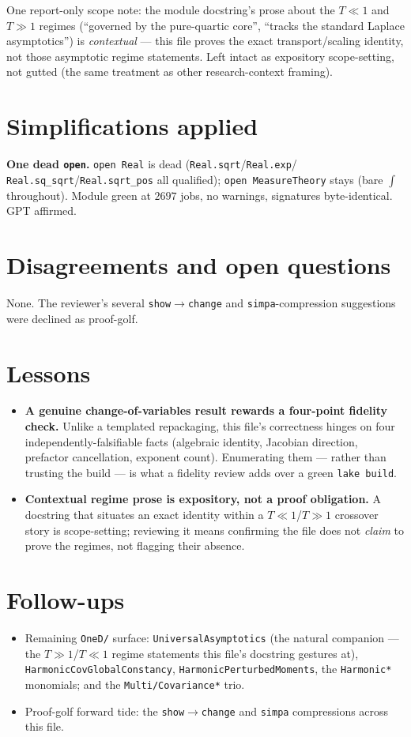\documentclass[11pt]{article}
\begin{document}
One report-only scope note: the module docstring's prose about the $T\ll1$ and $T\gg1$ regimes
(``governed by the pure-quartic core'', ``tracks the standard Laplace asymptotics'') is
\emph{contextual} --- this file proves the exact transport/scaling identity, not those asymptotic
regime statements. Left intact as expository scope-setting, not gutted (the same treatment as other
research-context framing).

\section{Simplifications applied}
\textbf{One dead \texttt{open}.} \texttt{open Real} is dead (\texttt{Real.sqrt}/\texttt{Real.exp}/%
\texttt{Real.sq\_sqrt}/\texttt{Real.sqrt\_pos} all qualified); \texttt{open MeasureTheory} stays
(bare $\int$ throughout). Module green at $2697$ jobs, no warnings, signatures byte-identical. GPT
affirmed.

\section{Disagreements and open questions}
None. The reviewer's several \texttt{show}$\to$\texttt{change} and \texttt{simpa}-compression
suggestions were declined as proof-golf.

\section{Lessons}
\begin{itemize}[noitemsep]
  \item \textbf{A genuine change-of-variables result rewards a four-point fidelity check.} Unlike a
    templated repackaging, this file's correctness hinges on four independently-falsifiable facts
    (algebraic identity, Jacobian direction, prefactor cancellation, exponent count). Enumerating
    them --- rather than trusting the build --- is what a fidelity review adds over a green
    \texttt{lake build}.
  \item \textbf{Contextual regime prose is expository, not a proof obligation.} A docstring that
    situates an exact identity within a $T\ll1$/$T\gg1$ crossover story is scope-setting; reviewing
    it means confirming the file does not \emph{claim} to prove the regimes, not flagging their
    absence.
\end{itemize}

\section{Follow-ups}
\begin{itemize}[noitemsep]
  \item Remaining \texttt{OneD/} surface: \texttt{UniversalAsymptotics} (the natural companion ---
    the $T\gg1$/$T\ll1$ regime statements this file's docstring gestures at),
    \texttt{HarmonicCovGlobalConstancy}, \texttt{HarmonicPerturbedMoments}, the \texttt{Harmonic*}
    monomials; and the \texttt{Multi/Covariance*} trio.
  \item Proof-golf forward tide: the \texttt{show}$\to$\texttt{change} and \texttt{simpa}
    compressions across this file.
\end{itemize}
\end{document}
